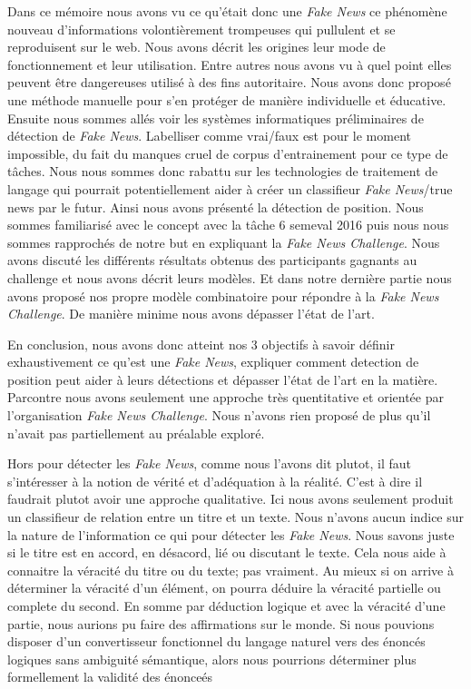 \documentclass[11pt,a4paper,oldfontcommands]{memoir}
\begin{document}
Dans ce mémoire nous avons vu ce qu'était donc une \textit{Fake News} ce phénomène nouveau d'informations volontièrement trompeuses qui pullulent et se reproduisent sur le web. Nous avons décrit les origines leur mode de fonctionnement et leur utilisation. Entre autres nous avons vu à quel point elles peuvent être dangereuses utilisé à des fins autoritaire. Nous avons donc proposé une méthode manuelle pour s'en protéger de manière individuelle et éducative. Ensuite nous sommes allés voir les systèmes informatiques préliminaires de détection de \textit{Fake News}. Labelliser comme vrai/faux est pour le moment impossible, du fait du manques cruel de corpus d'entrainement pour ce type de tâches. Nous nous sommes donc rabattu sur les technologies de traitement de langage qui pourrait potentiellement aider à créer un classifieur \textit{Fake News}/true news par le futur. Ainsi nous avons présenté la détection de position. Nous sommes familiarisé avec le concept avec la tâche 6 semeval 2016 puis nous nous sommes rapprochés de notre but en expliquant la \textit{Fake News Challenge}. Nous avons discuté les différents résultats obtenus des participants gagnants au challenge et nous avons décrit leurs modèles. Et dans notre dernière partie nous avons proposé nos propre modèle combinatoire pour répondre à la \textit{Fake News Challenge}. De manière minime nous avons dépasser l'état de l'art.

En conclusion, nous avons donc atteint nos 3 objectifs à savoir définir exhaustivement ce qu'est une \textit{Fake News}, expliquer comment detection de position peut aider à leurs détections et dépasser l'état de l'art en la matière.
Parcontre nous avons seulement une approche très quentitative et orientée par l'organisation \textit{Fake News Challenge}.
Nous n'avons rien proposé de plus qu'il n'avait pas partiellement au préalable exploré.

Hors pour détecter les \textit{Fake News}, comme nous l'avons dit plutot, il faut s'intéresser à la notion de vérité et d'adéquation à la réalité.
C'est à dire il faudrait plutot avoir une approche qualitative.
Ici nous avons seulement produit un classifieur de relation entre un titre et un texte.
Nous n'avons aucun indice sur la nature de l'information ce qui pour détecter les \textit{Fake News}.
Nous savons juste si le titre est en accord, en désacord, lié ou discutant le texte.
Cela nous aide à connaitre la véracité du titre ou du texte; pas vraiment.
Au mieux si on arrive à déterminer la véracité d'un élément, on pourra déduire la véracité partielle ou complete du second.
En somme par déduction logique et avec la véracité d'une partie, nous aurions pu faire des affirmations sur le monde.
Si nous pouvions disposer d'un convertisseur fonctionnel du langage naturel vers des énoncés logiques sans ambiguité sémantique, alors nous pourrions déterminer plus formellement la validité des énonceés
\end{document}
